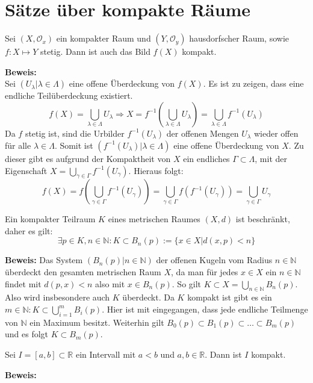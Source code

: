 \chapter{Sätze über kompakte Räume}

\begin{Satz}
Sei \( (X, \mathcal{O}_x) \) ein kompakter Raum und \((Y, \mathcal{O}_y)\) hausdorfscher Raum, sowie \(f: X \mapsto Y\) stetig.
Dann ist auch das Bild \( f(X) \) kompakt.
\end{Satz}
\textbf{Beweis:}
\\
Sei \( (U_{\lambda} | \lambda \in \Lambda) \) eine offene Überdeckung von \(f(X)\). Es ist zu zeigen,
dass eine endliche Teilüberdeckung existiert. 
\[ f(X) = \bigcup_{\lambda \in \Lambda} U_{\lambda} \Rightarrow X = 
   f^{-1}(\bigcup_{\lambda \in \Lambda} U_{\lambda}) = 
	 \bigcup_{\lambda \in \Lambda} f^{-1}(U_{\lambda}) \]
Da \(f\) stetig ist, sind die Urbilder \( f^{-1}(U_{\lambda}) \) der offenen Mengen \(U_{\lambda}\) wieder offen für 
alle \(\lambda \in \Lambda\). Somit ist \( ( f^{-1}(U_{\lambda}) | \lambda \in \Lambda ) \) eine offene Überdeckung
von \(X\). Zu dieser gibt es aufgrund der Kompaktheit von \(X\) ein endliches \( \Gamma \subset \Lambda \), mit 
der Eigenschaft \( X = \bigcup_{\gamma \in \Gamma} f^{-1}(U_{\gamma}) \). Hieraus folgt:
\[ f(X) = f(\bigcup_{\gamma \in \Gamma} f^{-1}(U_{\gamma})) = 
   \bigcup_{\gamma \in \Gamma} f(f^{-1}(U_{\gamma})) = 
   \bigcup_{\gamma \in \Gamma} U_{\gamma} \]

\begin{Satz}
	Ein kompakter Teilraum \(K\) eines metrischen Raumes \( (X, d) \) ist beschränkt, daher es gilt:
	\[ \exists p \in K, n \in \mathbb{N} : K \subset B_n(p) := \{ x \in X | d(x,p) < n \} \]
\end{Satz}
\textbf{Beweis:}
Das System \( (B_{n}(p) | n \in \mathbb{N}) \) der offenen Kugeln vom Radius \(n \in \mathbb{N}\) überdeckt 
den gesamten metrischen Raum \(X\), da man für jedes \(x \in X\) ein \(n \in \mathbb{N}\) findet mit \(d(p,x) < n\)
also mit \(x \in B_{n}(p)\).
So gilt \(K \subset X = \bigcup_{n \in \mathbb{N}} B_{n}(p)\). 
Also wird insbesondere auch \(K\) überdeckt. 
Da \(K\) kompakt ist gibt es ein \(m \in \mathbb{N} : K \subset \bigcup_{i=1}^{m} B_{i}(p) \). Hier ist
mit eingegangen, dass jede endliche Teilmenge von \(\mathbb{N}\) ein Maximum besitzt.
Weiterhin gilt \( B_0(p) \subset B_1(p) \subset \dots \subset B_m(p) \) und es folgt \(K \subset B_m(p)\).

\begin{Satz}
	Sei \(I = [ a , b ] \subset \mathbb{R}\) ein Intervall mit \(a<b\) und \(a,b \in \mathbb{R}\). Dann 
	ist \(I\) kompakt.
\end{Satz}
\textbf{Beweis:}

